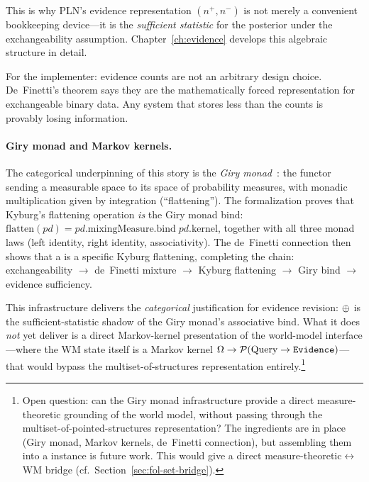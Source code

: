 \documentclass[11pt,openany]{report}
\begin{document}
This is why PLN's evidence representation $(n^+, n^-)$ is not merely a
convenient bookkeeping device---it is the \emph{sufficient statistic} for
the posterior under the exchangeability assumption.  Chapter~\ref{ch:evidence}
develops this algebraic structure in detail.

For the implementer: evidence counts are not an arbitrary design
choice.  De~Finetti's theorem says they are the mathematically forced
representation for exchangeable binary data.  Any system that stores
less than the counts is provably losing information.

\paragraph{Giry monad and Markov kernels.}
The categorical underpinning of this story is the \emph{Giry
monad}~\cite{Giry1982}: the functor sending a measurable space to its
space of probability measures, with monadic multiplication given by
integration (``flattening'').  The formalization proves that Kyburg's
flattening operation \emph{is} the Giry monad bind:
$\mathrm{flatten}(\mathit{pd}) =
\mathit{pd}.\mathrm{mixingMeasure}.\mathrm{bind}\;
\mathit{pd}.\mathrm{kernel}$,
together with all three monad laws (left identity, right identity,
associativity).  The de~Finetti connection then shows that a
 is a specific Kyburg flattening, completing
the chain: exchangeability $\to$ de~Finetti mixture $\to$ Kyburg
flattening $\to$ Giry bind $\to$ evidence sufficiency.

This infrastructure delivers the \emph{categorical} justification for
evidence revision: $\oplus$ is the sufficient-statistic shadow of the
Giry monad's associative bind.  What it does \emph{not} yet deliver
is a direct Markov-kernel presentation of the world-model
interface---where the WM state itself is a Markov kernel
$\Omega \to \mathcal{P}(\mathrm{Query} \to \mathtt{Evidence})$---that would
bypass the multiset-of-structures representation entirely.\footnote{Open
question: can the Giry monad infrastructure provide a direct
measure-theoretic grounding of the world model, without passing
through the multiset-of-pointed-structures representation?  The
ingredients are in place (Giry monad, Markov kernels, de~Finetti
connection), but assembling them into a
 instance is future work.
This would give a direct measure-theoretic$\leftrightarrow$WM bridge
(cf.\ Section~\ref{sec:fol-set-bridge}).}
\end{document}
